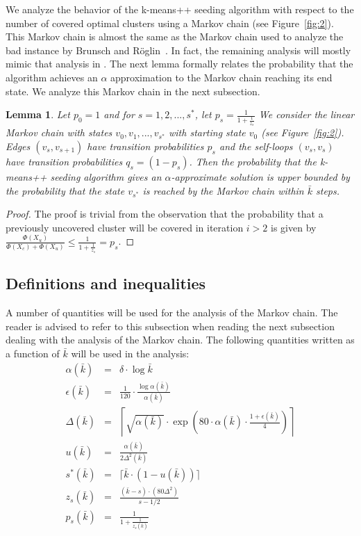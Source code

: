 \documentclass[11pt]{article}
\newtheorem{lemma}[theorem]{Lemma}
\newcommand{\eps}{{\epsilon}}
\begin{document}
We analyze the behavior of the k-means++ seeding algorithm with respect to the number of covered optimal clusters using a Markov chain (see Figure~\ref{fig:2}). 
This Markov chain is almost the same as the Markov chain used to analyze the bad instance by Brunsch and R\"{o}glin~\cite{br12}.
In fact, the remaining analysis will mostly mimic that analysis in \cite{br12}. 
The next lemma formally relates the probability that the algorithm achieves an $\alpha$ approximation to the Markov chain reaching its end state.
We analyze this Markov chain in the next subsection.


\begin{lemma}
Let $p_0 = 1$ and for $s = 1, 2, ..., s^*$, let 
$
p_s = \frac{1}{1 + \frac{1}{z_s}}
$
We consider the linear Markov chain with states $v_0, v_1, ..., v_{s^*}$ with starting state $v_0$ (see Figure~\ref{fig:2}).
Edges $(v_s, v_{s+1})$ have transition probabilities $p_s$ and the self-loops $(v_s, v_s)$ have transition probabilities $q_s = (1 - p_s)$.
Then the probability that the k-means++ seeding algorithm gives an $\alpha$-approximate solution is upper bounded by the probability that the state $v_{s^*}$ is reached by the Markov chain within $\bar{k}$ steps.
\end{lemma}
\begin{proof}
The proof is trivial from the observation that the probability that a previously uncovered cluster will be covered in iteration $i >2$ is given by $\frac{\Phi(X_u)}{\Phi(X_c) + \Phi(X_u)} \leq \frac{1}{1 + \frac{1}{z_s}} = p_s$.
\end{proof}


\subsection{Definitions and inequalities}
A number of quantities will be used for the analysis of the Markov chain. 
The reader is advised to refer to this subsection when reading the next subsection dealing with the analysis of the Markov chain.
The following quantities written as a function of $\bar{k}$ will be used in the analysis:
\begin{eqnarray}
\alpha(\bar{k}) &=& \delta \cdot \log{\bar{k}} \label{eqn:E1} \\
\eps(\bar{k}) &=& \frac{1}{120} \cdot \frac{\log{\alpha(\bar{k})}}{\alpha(\bar{k})} \label{eqn:E2} \\
\Delta(\bar{k}) &=& \left\lceil \sqrt{\alpha(\bar{k})} \cdot \exp \left(80 \cdot \alpha(\bar{k}) \cdot \frac{1 + \eps(\bar{k})}{4} \right)\right\rceil  \label{eqn:E3} \\
u(\bar{k}) &=& \frac{\alpha(\bar{k})}{2 \Delta^2(\bar{k})}  \label{eqn:E4} \\
s^*(\bar{k}) &=& \lceil \bar{k} \cdot (1 - u(\bar{k}))\rceil  \label{eqn:E5}\\
z_s(\bar{k}) &=& \frac{(\bar{k}-s) \cdot (80 \Delta^2)}{s - 1/2} \label{eqn:E6}\\
p_s(\bar{k}) &=& \frac{1}{1 + \frac{1}{z_s(\bar{k})}} \label{eqn:E7}
\end{eqnarray}
\end{document}
